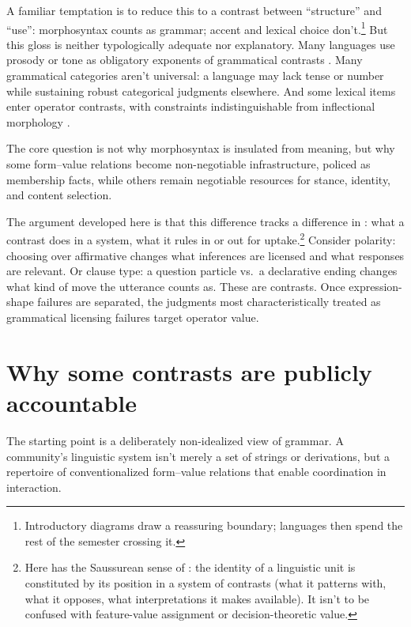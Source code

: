 \documentclass[12pt,letterpaper]{article}
\begin{document}
A familiar temptation is to reduce this to a contrast between \enquote{structure} and \enquote{use}: morphosyntax counts as grammar; accent and lexical choice don't.\footnote{Introductory diagrams draw a reassuring boundary; languages then spend the rest of the semester crossing it.} But this gloss is neither typologically adequate nor explanatory. Many languages use prosody or tone as obligatory exponents of grammatical contrasts \citep{hyman2011,ladd2008}. Many grammatical categories aren't universal: a language may lack tense \citep{comrie1985} or number \citep{corbett2000} while sustaining robust categorical judgments elsewhere. And some lexical items enter operator contrasts, with constraints indistinguishable from inflectional morphology \citep{hoppertraugott2003,bybee2010}.

The core question is not why morphosyntax is insulated from meaning, but why some form--value relations become non-negotiable infrastructure, policed as membership facts, while others remain negotiable resources for stance, identity, and content selection.

The argument developed here is that this difference tracks a difference in : what a contrast does in a system, what it rules in or out for uptake.\footnote{Here  has the Saussurean sense of  \citep{saussure1916}: the identity of a linguistic unit is constituted by its position in a system of contrasts (what it patterns with, what it opposes, what interpretations it makes available). It isn't to be confused with feature-value assignment or decision-theoretic value.} Consider polarity: choosing  over affirmative changes what inferences are licensed and what responses are relevant. Or clause type: a question particle vs.\ a declarative ending changes what kind of move the utterance counts as. These are  contrasts. Once expression-shape failures are separated, the judgments most characteristically treated as grammatical licensing failures target operator value.

\section{Why some contrasts are publicly accountable}

The starting point is a deliberately non-idealized view of grammar. A community's linguistic system isn't merely a set of strings or derivations, but a repertoire of conventionalized form--value relations that enable coordination in interaction.
\end{document}
